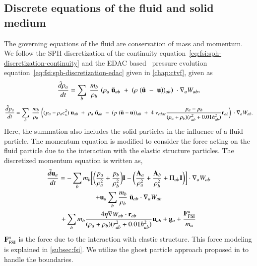 \subsection{Discrete equations of the fluid and solid medium}\label{subsec:discrete-fluid}
The governing equations of the fluid are conservation of mass and momentum. We
follow the SPH discretization of the continuity
equation~\eqref{eq:fsi:sph-discretization-continuity} and the EDAC
based~\citep{PRKP:edac-sph-iccm2015} pressure evolution
equation~\eqref{eq:fsi:sph-discretization-edac} given in \cref{chap:ctvf}, given
as
\begin{equation}
  \label{eq:fsi:sph-discretization-continuity}
  \frac{\tilde{d}\rho_a}{dt} = \sum_{b} \; \frac{m_b}{\rho_{b}} \; (
  \rho_{a} \; \tilde{\mathbf{u}}_{ab} \; + \;
  (\rho \; (\tilde{\mathbf{u}} \; - \;
  \mathbf{u}))_{ab}) \; \cdot \nabla_{a} W_{ab},
\end{equation}
\begin{multline}
  \label{eq:fsi:sph-discretization-edac}
  \frac{\tilde{d}p_a}{dt} = \sum_{b} \; \frac{m_b}{\rho_{b}} \; \bigg(
  (p_{a} - \rho_{a} c_{s}^2) \; \mathbf{u}_{ab} \; + \;
  p_{a} \; \tilde{\mathbf{u}}_{ab} \; - \;
  (p \; (\tilde{\mathbf{u}} - \mathbf{u}))_{ab} \; + \;
  4 \; \nu_{edac}
  \frac{p_a - p_b}{(\rho_a + \rho_b) (r^2_{ab} + 0.01 h_{ab}^{2})} \mathbf{r}_{ab}
  \bigg) \; \cdot \nabla_{a} W_{ab}.
\end{multline}
%
Here, the summation also includes the solid particles in the influence of a
fluid particle. The momentum equation is modified to consider the force
acting on the fluid particle due to the interaction with the elastic structure
particles. The discretized momentum equation is written as,
\begin{multline}
  \label{eq:fsi:sph-momentum-fluid}
  \frac{\tilde{d}\mathbf{u}_{a}}{dt} = - \sum_{b} m_b \bigg[
  \bigg(\frac{p_a}{\rho_a^2} + \frac{p_b}{\rho_b^2}\bigg) \mathbf{I} -
  \bigg(\frac{\mathbf{A}_a}{\rho_a^2} + \frac{\mathbf{A}_b}{\rho_b^2} + \Pi_{ab}
  \mathbf{I} \bigg) \bigg]
  \cdot \nabla_{a} W_{ab} \\
  + \mathbf{u}_{a} \sum_{b} \frac{m_b}{\rho_{b}} \; \tilde{\mathbf{u}}_{ab} \cdot
  \nabla_{a} W_{ab} \\+ \sum_{b} m_b \frac{4 \eta \nabla W_{ab}\cdot
    \mathbf{r}_{ab}}{(\rho_a + \rho_b) (r_{ab}^2 + 0.01 h_{ab}^2)} \mathbf{u}_{ab} +
  \mathbf{g}_{a} + \frac{\mathbf{F}^a_{\text{FSI}}}{m_a}
\end{multline}
$\mathbf{F}^a_{\text{FSI}}$ is the force due to the interaction with elastic
structure. This force modeling is explained in \cref{subsec:fsi}. We utilize the
ghost particle approach proposed in \citep{Adami2012} to handle the boundaries.


